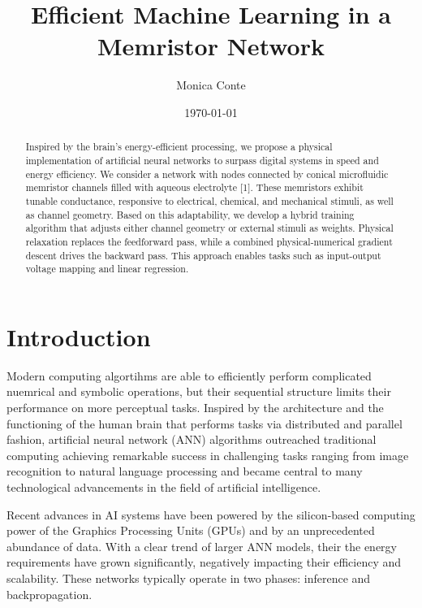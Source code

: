 \documentclass[reprint,superscriptaddress,prb,showkeys]{revtex4-2}
\begin{document}
\title{Efficient Machine Learning in a Memristor Network}

\author{Monica Conte}

\date{\today}

\begin{abstract}
Inspired by the brain's energy-efficient processing, we propose a physical implementation of artificial neural networks to surpass digital systems in speed and energy efficiency. We consider a network with nodes connected by conical microfluidic memristor channels filled with aqueous electrolyte [1]. These memristors exhibit tunable conductance, responsive to electrical, chemical, and mechanical stimuli, as well as channel geometry. Based on this adaptability, we develop a hybrid training algorithm that adjusts either channel geometry or external stimuli as weights. Physical relaxation replaces the feedforward pass, while a combined physical-numerical gradient descent drives the backward pass. This approach enables tasks such as input-output voltage mapping and linear regression.
\end{abstract}
\maketitle

\renewcommand{\figurename}{FIG.}

\section{\label{sec:Intro}Introduction}


Modern computing algortihms are able to efficiently perform complicated nuemrical and symbolic operations, but their sequential structure limits their performance on more perceptual tasks. Inspired by the architecture and the functioning of the human brain that performs tasks via distributed and parallel fashion, artificial neural network (ANN) algorithms outreached traditional computing achieving remarkable success in challenging tasks ranging from image recognition to natural language processing and became central to many technological advancements in the field of artificial intelligence.

Recent advances in AI systems have been powered by the silicon-based computing power of the Graphics Processing Units (GPUs) and by an unprecedented abundance of data. With a clear trend of larger ANN models, their the energy requirements have grown significantly, negatively impacting their efficiency and scalability\cite{energy_cost_ml1, energy_cost_ml2}. 
These networks typically operate in two phases: inference and backpropagation.
\end{document}

